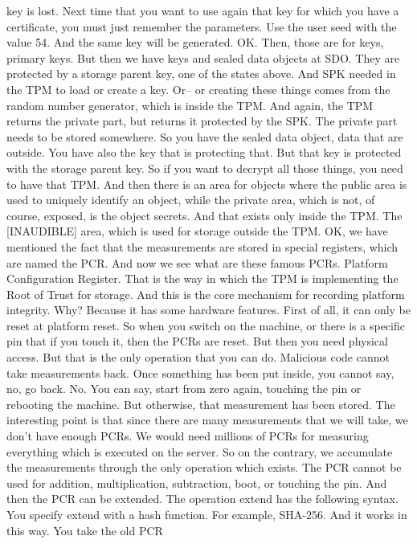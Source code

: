  key is lost. Next time that you want to use again that key for which you have
 a certificate, you must just remember the parameters. Use the user seed with
 the value 54. And the same key will be generated. OK. Then, those are for
 keys, primary keys. But then we have keys and sealed data objects at SDO. They
 are protected by a storage parent key, one of the states above. And SPK needed
 in the TPM to load or create a key. Or-- or creating these things comes from
 the random number generator, which is inside the TPM. And again, the TPM
 returns the private part, but returns it protected by the SPK. The private
 part needs to be stored somewhere. So you have the sealed data object, data
 that are outside. You have also the key that is protecting that. But that key
 is protected with the storage parent key. So if you want to decrypt all those
 things, you need to have that TPM. And then there is an area for objects where
 the public area is used to uniquely identify an object, while the private
 area, which is not, of course, exposed, is the object secrets. And that exists
 only inside the TPM. The [INAUDIBLE] area, which is used for storage outside
 the TPM. OK, we have mentioned the fact that the measurements are stored in
 special registers, which are named the PCR. And now we see what are these
 famous PCRs. Platform Configuration Register. That is the way in which the TPM
 is implementing the Root of Trust for storage. And this is the core mechanism
 for recording platform integrity. Why? Because it has some hardware features.
 First of all, it can only be reset at platform reset. So when you switch on
 the machine, or there is a specific pin that if you touch it, then the PCRs
 are reset. But then you need physical access. But that is the only operation
 that you can do. Malicious code cannot take measurements back. Once something
 has been put inside, you cannot say, no, go back. No. You can say, start from
 zero again, touching the pin or rebooting the machine. But otherwise, that
 measurement has been stored. The interesting point is that since there are
 many measurements that we will take, we don't have enough PCRs. We would need
 millions of PCRs for measuring everything which is executed on the server. So
 on the contrary, we accumulate the measurements through the only operation
 which exists. The PCR cannot be used for addition, multiplication,
 subtraction, boot, or touching the pin. And then the PCR can be extended. The
 operation extend has the following syntax. You specify extend with a hash
 function. For example, SHA-256. And it works in this way. You take the old PCR
